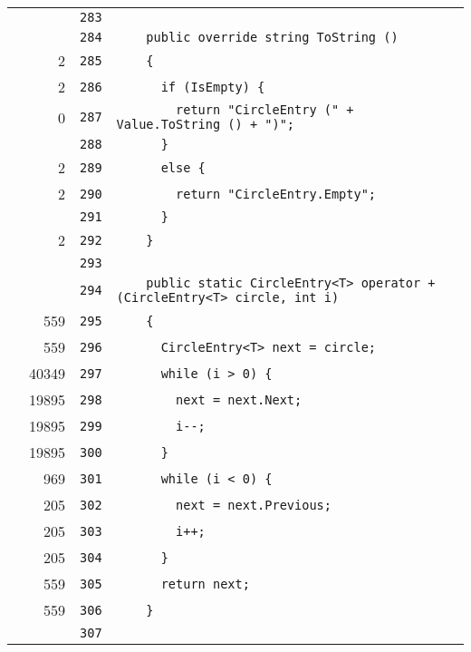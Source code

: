 \documentclass[a4paper,10pt]{article}
\begin{document}
\begin{longtable}[l]{lrrl}
\cellcolor{gray} &  & \verb~283~ & \verb~~\\
\cellcolor{gray} &  & \verb~284~ & \verb~    public override string ToString ()~\\
\cellcolor{green} & 2 & \verb~285~ & \verb~    {~\\
\cellcolor{green} & 2 & \verb~286~ & \verb~      if (IsEmpty) {~\\
\cellcolor{red} & 0 & \verb~287~ & \verb~        return "CircleEntry (" + Value.ToString () + ")";~\\
\cellcolor{gray} &  & \verb~288~ & \verb~      }~\\
\cellcolor{green} & 2 & \verb~289~ & \verb~      else {~\\
\cellcolor{green} & 2 & \verb~290~ & \verb~        return "CircleEntry.Empty";~\\
\cellcolor{gray} &  & \verb~291~ & \verb~      }~\\
\cellcolor{green} & 2 & \verb~292~ & \verb~    }~\\
\cellcolor{gray} &  & \verb~293~ & \verb~~\\
\cellcolor{gray} &  & \verb~294~ & \verb~    public static CircleEntry<T> operator + (CircleEntry<T> circle, int i)~\\
\cellcolor{green} & 559 & \verb~295~ & \verb~    {~\\
\cellcolor{green} & 559 & \verb~296~ & \verb~      CircleEntry<T> next = circle;~\\
\cellcolor{green} & 40349 & \verb~297~ & \verb~      while (i > 0) {~\\
\cellcolor{green} & 19895 & \verb~298~ & \verb~        next = next.Next;~\\
\cellcolor{green} & 19895 & \verb~299~ & \verb~        i--;~\\
\cellcolor{green} & 19895 & \verb~300~ & \verb~      }~\\
\cellcolor{green} & 969 & \verb~301~ & \verb~      while (i < 0) {~\\
\cellcolor{green} & 205 & \verb~302~ & \verb~        next = next.Previous;~\\
\cellcolor{green} & 205 & \verb~303~ & \verb~        i++;~\\
\cellcolor{green} & 205 & \verb~304~ & \verb~      }~\\
\cellcolor{green} & 559 & \verb~305~ & \verb~      return next;~\\
\cellcolor{green} & 559 & \verb~306~ & \verb~    }~\\
\cellcolor{gray} &  & \verb~307~ & \verb~~\\

\end{longtable}
\end{document}
